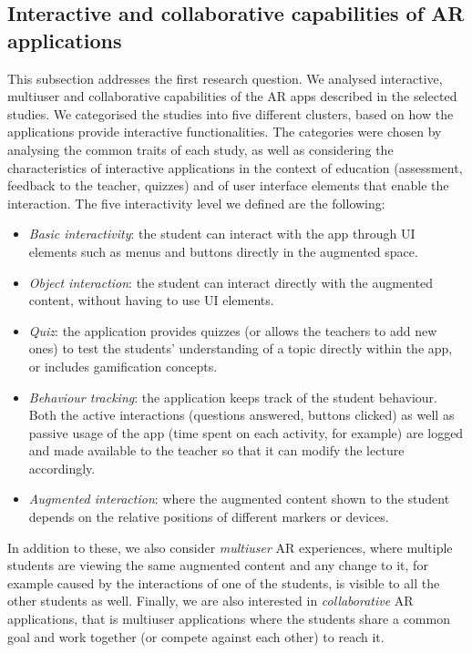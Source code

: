 \subsection{Interactive and collaborative capabilities of AR applications}

This subsection addresses the first research question. We analysed interactive, multiuser and collaborative capabilities of the \gls{AR} apps described in the selected studies. We categorised the studies into five different clusters, based on how the applications provide interactive functionalities. The categories were chosen by analysing the common traits of each study, as well as considering the characteristics of interactive applications in the context of education (assessment, feedback to the teacher, quizzes) and of user interface elements that enable the interaction.  The five interactivity level we defined are the following:

\begin{itemize}
    \item \emph{Basic interactivity}: the student can interact with the app through \gls{UI} elements such as menus and buttons directly in the augmented space.
    \item \emph{Object interaction}: the student can interact directly with the augmented content, without having to use \gls{UI} elements.
    \item \emph{Quiz}: the application provides quizzes (or allows the teachers to add new ones) to test the students' understanding of a topic directly within the app, or includes gamification concepts.
    \item \emph{Behaviour tracking}: the application keeps track of the student behaviour. Both the active interactions (questions answered, buttons clicked) as well as passive usage of the app (time spent on each activity, for example) are logged and made available to the teacher so that it can modify the lecture accordingly.
    \item \emph{Augmented interaction}: where the augmented content shown to the student depends on the relative positions of different markers or devices.
\end{itemize}

In addition to these, we also consider \emph{multiuser} \gls{AR} experiences, where multiple students are viewing the same augmented content and any change to it, for example caused by the interactions of one of the students, is visible to all the other students as well.
Finally, we are also interested in \emph{collaborative} \gls{AR} applications, that is multiuser applications where the students share a common goal and work together (or compete against each other) to reach it.


